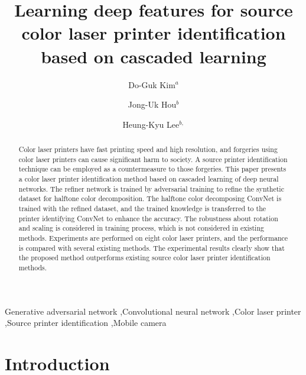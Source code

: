\documentclass[5p, times]{elsarticle}
\begin{document}
\begin{frontmatter}

\title{Learning deep features for source color laser printer identification \\ based on cascaded learning}

\author{Do-Guk Kim$^a$}
\author{Jong-Uk Hou$^b$}
\author{Heung-Kyu Lee$^{b,}$}

\address{$^a$Graduate School of Information Security, KAIST, $^b$School of Computing, KAIST}
\address{Korea Advanced Institute of Science and Technology, Guseong-dong, Yuseong-gu, Daejeon 305-701, Republic of Korea}


\begin{abstract}
Color laser printers have fast printing speed and high resolution, and forgeries using color laser printers can cause significant harm to society. A source printer identification technique can be employed as a countermeasure to those forgeries. This paper presents a color laser printer identification method based on cascaded learning of deep neural networks. The refiner network is trained by adversarial training to refine the synthetic dataset for halftone color decomposition. The halftone color decomposing ConvNet is trained with the refined dataset, and the trained knowledge is transferred to the printer identifying ConvNet to enhance the accuracy. The robustness about rotation and scaling is considered in training process, which is not considered in existing methods. Experiments are performed on eight color laser printers, and the performance is compared with several existing methods. The experimental results clearly show that the proposed method outperforms existing source color laser printer identification methods.
\end{abstract}

\begin{keyword}
Generative adversarial network \sep Convolutional neural network \sep Color laser printer \sep Source printer identification \sep Mobile camera
\end{keyword}

\end{frontmatter}


\section{Introduction}
\end{document}
